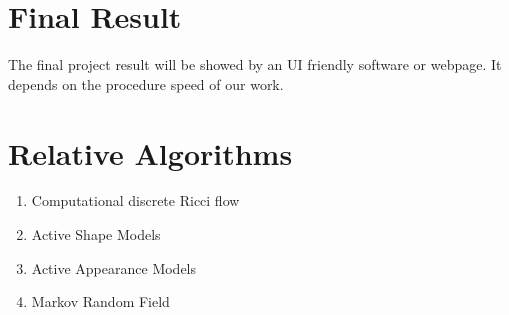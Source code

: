 \documentclass[11pt]{article}
\begin{document}
\section{Final Result}
The final project result will be showed by an UI friendly software or webpage. It depends on the procedure speed of our work.
\section{Relative Algorithms}
\begin{enumerate}
\item
Computational discrete Ricci flow
\item
Active Shape Models
\item
Active Appearance Models
\item
Markov Random Field

\end{enumerate}
\end{document}

